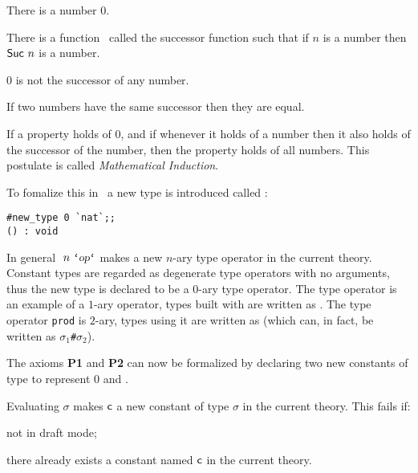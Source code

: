 \begin{list}{{\small\bf P}}{
\setlength{\leftmargin}{12mm}
\setlength{\rightmargin}{7mm}
\setlength{\labelwidth}{6mm}
\setlength{\labelsep}{2mm}
\setlength{\listparindent}{0mm}
\setlength{\itemsep}{14pt plus1pt minus1pt}
\setlength{\topsep}{3mm}
\setlength{\parsep}{0mm}}

\item There is a number $0$.
\item There is a function \Suc\ called the successor function such that
if $n$ is a number then ${\sf Suc} \ n$ is a number.
\item $0$ is not the successor of any number.
\item If two numbers have the same successor then they are equal.
\item If a property holds of $0$, and if whenever it holds of a number then it
also holds of the successor of the number, then the property holds of all
numbers. This postulate is called {\it Mathematical Induction}.
\end{list}

To fomalize this in \HOL\ a new type is introduced called :

\begin{session}\begin{verbatim}
#new_type 0 `nat`;;
() : void
\end{verbatim}\end{session}

    In general $\ n\ \ml{`\ty{op}`}$ makes  a new
    $n$-ary type operator in the current theory.  Constant types are
    regarded as degenerate type operators with no arguments, thus the
    new type  is declared to be a $0$-ary type operator. The
    type operator  is an example of a $1$-ary operator, types
    built with  are written as . The type
    operator {\small\verb|prod|} is $2$-ary, types using it are
    written as  (which can, in fact,
    be written as $\sigma_1${\small\verb|#|}$\sigma_2$).

    The axioms {\small\bf P1} and {\small\bf P2} can now be formalized
    by declaring two new constants of type  to represent $0$
    and \Suc.

    Evaluating $\sigma$\ml{)} makes
    ${\sf c}$ a new constant of type $\sigma$ in the current theory.
    This fails if:

\begin{myenumerate}
\item not in draft mode;
\item there already exists a constant named ${\sf c}$ in the current
theory.
\end{myenumerate}

